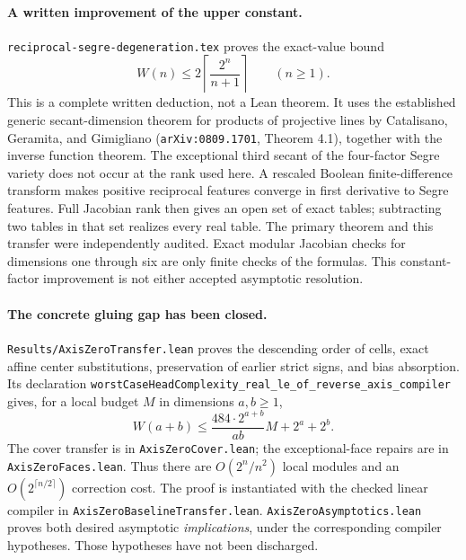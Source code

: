 \documentclass[11pt]{article}
\begin{document}
\paragraph{A written improvement of the upper constant.}
\texttt{reciprocal-segre-degeneration.tex} proves the exact-value bound
\[
 W(n)\leq2\left\lceil\frac{2^n}{n+1}\right\rceil\qquad(n\geq1).
\]
This is a complete written deduction, not a Lean theorem. It uses the
established generic secant-dimension theorem for products of projective
lines by Catalisano, Geramita, and Gimigliano
(\texttt{arXiv:0809.1701}, Theorem 4.1), together with the inverse function
theorem. The exceptional third secant of the four-factor Segre variety
does not occur at the rank used here. A rescaled Boolean finite-difference
transform makes positive reciprocal features converge in first derivative
to Segre features. Full Jacobian rank then gives an open set of exact
tables; subtracting two tables in that set realizes every real table.
The primary theorem and this transfer were independently audited.
Exact modular Jacobian checks for dimensions one through six are only
finite checks of the formulas. This constant-factor improvement is not
either accepted asymptotic resolution.

\paragraph{The concrete gluing gap has been closed.}
\texttt{Results/AxisZeroTransfer.lean} proves the descending order of
cells, exact affine center substitutions, preservation of earlier strict
signs, and bias absorption. Its declaration
\texttt{worstCaseHeadComplexity\_real\_le\_of\_reverse\_axis\_compiler}
gives, for a local budget $M$ in dimensions $a,b\geq1$,
\[
 W(a+b)\leq\frac{484\cdot2^{a+b}}{ab}M+2^a+2^b.
\]
The cover transfer is in \texttt{AxisZeroCover.lean}; the exceptional-face
repairs are in \texttt{AxisZeroFaces.lean}. Thus there are
$O(2^n/n^2)$ local modules and an $O(2^{\lceil n/2\rceil})$
correction cost. The proof is instantiated with the checked linear
compiler in \texttt{AxisZeroBaselineTransfer.lean}.
\texttt{AxisZeroAsymptotics.lean} proves both desired asymptotic
\emph{implications}, under the corresponding compiler hypotheses.
Those hypotheses have not been discharged.
\end{document}
